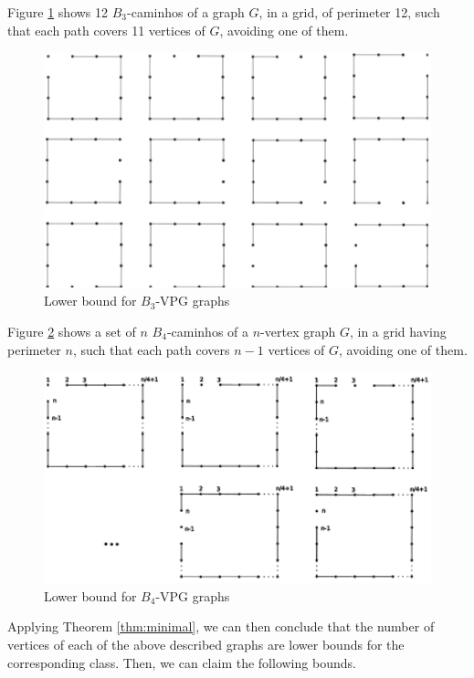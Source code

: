Figure \ref{VPG:lower-B3} shows 12 $B_3$-caminhos of a graph $G$, in a grid, of perimeter 12, such that each path covers 11  vertices of $G$,  avoiding one of them. 

\begin{figure}[!h]
    \centering
    \includegraphics[width=12cm]{./img/lower-bound-B3-VPG.pdf}
    \caption{Lower bound for $B_3$-VPG graphs}
    \label{VPG:lower-B3}
\end{figure}

Figure \ref{VPG:lower-B4} shows a set of $n$ $B_4$-caminhos of a $n$-vertex graph $G$, in a grid having perimeter $n$,  such that each path covers $n-1$  vertices of $G$, avoiding one of them. 

\begin{figure}[!h]
    \centering
    \includegraphics[width=12cm]{./img/lower-bound-B4-VPG.pdf}
    \caption{Lower bound for $B_4$-VPG graphs}
    \label{VPG:lower-B4}
\end{figure}

Applying Theorem \ref{thm:minimal}, we can then conclude that the number of vertices of each of the above described graphs are lower bounds for the corresponding class. Then, we can claim the following bounds.

